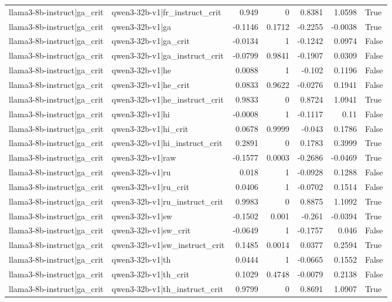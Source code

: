 \begin{table}
\begin{tabular}{l l r r r r l}
llama3-8b-instruct|ga_crit & qwen3-32b-v1|fr_instruct_crit & 0.949 & 0 & 0.8381 & 1.0598 & True \\
llama3-8b-instruct|ga_crit & qwen3-32b-v1|ga & -0.1146 & 0.1712 & -0.2255 & -0.0038 & True \\
llama3-8b-instruct|ga_crit & qwen3-32b-v1|ga_crit & -0.0134 & 1 & -0.1242 & 0.0974 & False \\
llama3-8b-instruct|ga_crit & qwen3-32b-v1|ga_instruct_crit & -0.0799 & 0.9841 & -0.1907 & 0.0309 & False \\
llama3-8b-instruct|ga_crit & qwen3-32b-v1|he & 0.0088 & 1 & -0.102 & 0.1196 & False \\
llama3-8b-instruct|ga_crit & qwen3-32b-v1|he_crit & 0.0833 & 0.9622 & -0.0276 & 0.1941 & False \\
llama3-8b-instruct|ga_crit & qwen3-32b-v1|he_instruct_crit & 0.9833 & 0 & 0.8724 & 1.0941 & True \\
llama3-8b-instruct|ga_crit & qwen3-32b-v1|hi & -0.0008 & 1 & -0.1117 & 0.11 & False \\
llama3-8b-instruct|ga_crit & qwen3-32b-v1|hi_crit & 0.0678 & 0.9999 & -0.043 & 0.1786 & False \\
llama3-8b-instruct|ga_crit & qwen3-32b-v1|hi_instruct_crit & 0.2891 & 0 & 0.1783 & 0.3999 & True \\
llama3-8b-instruct|ga_crit & qwen3-32b-v1|raw & -0.1577 & 0.0003 & -0.2686 & -0.0469 & True \\
llama3-8b-instruct|ga_crit & qwen3-32b-v1|ru & 0.018 & 1 & -0.0928 & 0.1288 & False \\
llama3-8b-instruct|ga_crit & qwen3-32b-v1|ru_crit & 0.0406 & 1 & -0.0702 & 0.1514 & False \\
llama3-8b-instruct|ga_crit & qwen3-32b-v1|ru_instruct_crit & 0.9983 & 0 & 0.8875 & 1.1092 & True \\
llama3-8b-instruct|ga_crit & qwen3-32b-v1|sw & -0.1502 & 0.001 & -0.261 & -0.0394 & True \\
llama3-8b-instruct|ga_crit & qwen3-32b-v1|sw_crit & -0.0649 & 1 & -0.1757 & 0.046 & False \\
llama3-8b-instruct|ga_crit & qwen3-32b-v1|sw_instruct_crit & 0.1485 & 0.0014 & 0.0377 & 0.2594 & True \\
llama3-8b-instruct|ga_crit & qwen3-32b-v1|th & 0.0444 & 1 & -0.0665 & 0.1552 & False \\
llama3-8b-instruct|ga_crit & qwen3-32b-v1|th_crit & 0.1029 & 0.4748 & -0.0079 & 0.2138 & False \\
llama3-8b-instruct|ga_crit & qwen3-32b-v1|th_instruct_crit & 0.9799 & 0 & 0.8691 & 1.0907 & True \\

\end{tabular}
\end{table}
